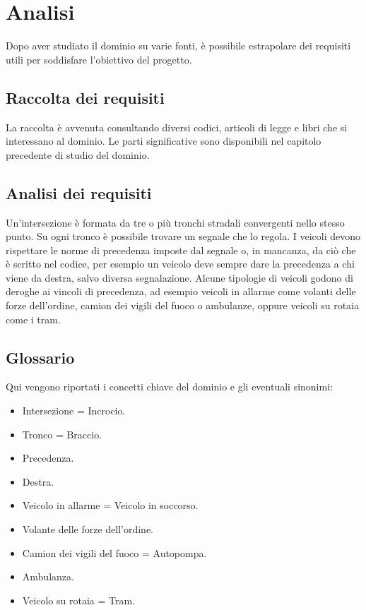 \chapter{Analisi}

Dopo aver studiato il dominio su varie fonti, è possibile estrapolare dei requisiti utili per soddisfare l'obiettivo del progetto.

\section{Raccolta dei requisiti}
La raccolta è avvenuta consultando diversi codici, articoli di legge e libri che si interessano al dominio. Le parti significative sono disponibili nel capitolo precedente di studio del dominio.

\section{Analisi dei requisiti}
Un'intersezione è formata da tre o più tronchi stradali convergenti nello stesso punto. Su ogni tronco è possibile trovare un segnale che lo regola. I veicoli devono rispettare le norme di precedenza imposte dal segnale o, in mancanza, da ciò che è scritto nel codice, per esempio un veicolo deve sempre dare la precedenza a chi viene da destra, salvo diversa segnalazione. Alcune tipologie di veicoli godono di deroghe ai vincoli di precedenza, ad esempio veicoli in allarme come volanti delle forze dell'ordine, camion dei vigili del fuoco o ambulanze, oppure veicoli su rotaia come i tram.

\section{Glossario}
\label{sec:glossary}
Qui vengono riportati i concetti chiave del dominio e gli eventuali sinonimi:
\begin{itemize}
	\item Intersezione = Incrocio.
	\item Tronco = Braccio.
	\item Precedenza.
	\item Destra.
	\item Veicolo in allarme = Veicolo in soccorso.
	\item Volante delle forze dell'ordine.
	\item Camion dei vigili del fuoco = Autopompa.
	\item Ambulanza.
	\item Veicolo su rotaia = Tram.
\end{itemize}
